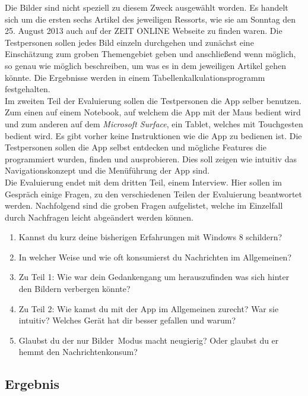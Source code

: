 \documentclass[12pt,a4paper,bibtotoc]{scrartcl}
\begin{document}
Die Bilder sind nicht speziell zu diesem Zweck ausgewählt worden. Es handelt sich um die ersten sechs Artikel des jeweiligen Ressorts, wie sie am Sonntag den 25. August 2013 auch auf der ZEIT ONLINE Webseite zu finden waren. Die Testpersonen sollen jedes Bild einzeln durchgehen und zunächst eine Einschätzung zum groben Themengebiet geben und anschließend wenn möglich, so genau wie möglich beschreiben, um was es in dem jeweiligen Artikel gehen könnte. Die Ergebnisse werden in einem Tabellenkalkulationsprogramm festgehalten.\\

Im zweiten Teil der Evaluierung sollen die Testpersonen die App selber benutzen. Zum einen auf einem Notebook, auf welchem die App mit der Maus bedient wird und zum anderen auf dem \textit{Microsoft Surface}, ein Tablet, welches mit Touchgesten bedient wird. Es gibt vorher keine Instruktionen wie die App zu bedienen ist. Die Testpersonen sollen die App selbst entdecken und mögliche Features die programmiert wurden, finden und ausprobieren. Dies soll zeigen wie intuitiv das Navigationskonzept und die Menüführung der App sind.\\

Die Evaluierung endet mit dem dritten Teil, einem Interview. Hier sollen im Gespräch einige Fragen, zu den verschiedenen Teilen der Evaluierung beantwortet werden. Nachfolgend sind die groben Fragen aufgelistet, welche im Einzelfall durch Nachfragen leicht abgeändert werden können.

\begin{enumerate}
	\item Kannst du kurz deine bisherigen Erfahrungen mit Windows 8 schildern?
	\item In welcher Weise und wie oft konsumierst du Nachrichten im Allgemeinen? 
	\item Zu Teil 1: Wie war dein Gedankengang um herauszufinden was sich hinter den Bildern verbergen könnte?
	\item Zu Teil 2: Wie kamst du mit der App im Allgemeinen zurecht? War sie intuitiv? Welches Gerät hat dir besser gefallen und warum?
	\item Glaubst du der \glqq nur Bilder\grqq\ Modus macht neugierig? Oder glaubst du er hemmt den Nachrichtenkonsum? 
\end{enumerate}




\subsection{Ergebnis}
\label{subsec:ergebnis}
\end{document}
